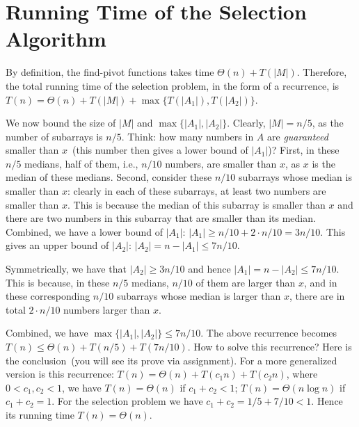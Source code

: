 \section*{Running Time of the Selection Algorithm}

By definition, the find-pivot functions takes time $\Theta(n) + T(|M|)$.
Therefore, the total running time of the selection problem, in the form of a recurrence,
is $T(n) = \Theta(n) + T(|M|) + \max\{T(|A_1|), T(|A_2|)\}$.

We now bound the size of $|M|$ and $\max\{|A_1|, |A_2|\}$.
Clearly, $|M| = n/5$, as the number of subarrays is $n/5$.
Think: how many numbers in $A$ are \emph{guaranteed} smaller than $x$~(this number then gives a lower bound of $|A_1|$)?
First, in these $n/5$ medians, half of them, i.e., $n/10$ numbers, are smaller than $x$, as $x$ is the median of these medians.
Second, consider these $n/10$ subarrays whose median is smaller than $x$: clearly in each of these subarrays, at least
two numbers are smaller than $x$. This is because the median of this subarray is smaller than $x$ and there are two numbers
in this subarray that are smaller than its median. Combined, we have a lower bound of $|A_1|$: $|A_1| \ge n/10 + 2 \cdot n/10 = 3n/10$.
This gives an upper bound of $|A_2|$: $|A_2| = n - |A_1| \le 7n/10$.

Symmetrically, we have that $|A_2| \ge 3n/10$ and hence $|A_1| = n - |A_2| \le 7n/10$.
This is because, in these $n/5$ medians, $n/10$ of them are larger than $x$,
and in these corresponding $n/10$ subarrays whose median is larger than $x$, there are in total $2\cdot n/10$ numbers larger than $x$.

Combined, we have $\max\{|A_1|, |A_2|\} \le 7n/10$.  The above recurrence becomes $T(n) \le \Theta(n) + T(n/5) + T(7n/10)$.
How to solve this recurrence? Here is the conclusion~(you will see its prove via assignment).
For a more generalized version is this recurrence: $T(n) = \Theta(n) + T(c_1n) + T(c_2n)$, where $0 < c_1, c_2 < 1$, 
we have $T(n) = \Theta(n)$ if $c_1 + c_2 < 1$;
$T(n) = \Theta(n\log n)$ if $c_1 + c_2 = 1$.
For the selection problem we have $c_1 + c_2 = 1/5 + 7/10 < 1$. Hence
its running time $T(n) = \Theta(n)$.


